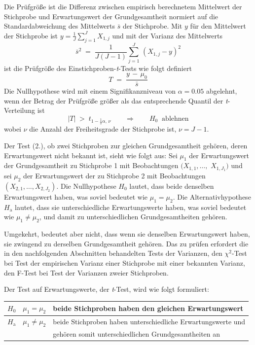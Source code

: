 Die Prüfgröße ist die Differenz zwischen empirisch berechnetem Mittelwert der Stichprobe
und Erwartungswert der Grundgesamtheit normiert auf die
Standardabweichung des Mittelwerts $\bar s$ der Stichprobe. Mit $y$ für den Mittelwert der
Stichprobe ist $y = \frac{1}{J}\sum_{j=1}^J X_{1,j}$ und mit der Varianz des Mittelwerts
\begin{equation}
\bar s^2 \; = \; \frac{1}{J (J - 1)} \sum_{j=1}^{J} \, (X_{1,j} - y)^2
\end{equation}
ist die Prüfgröße des Einstichproben-\textsl{t}-Tests wie folgt definiert
\begin{equation}
T \; = \; \frac{y \, - \, \mu_0}{\bar s}
\label{tTestonesample}
\end{equation}
Die Nullhypothese wird mit einem Signifikanzniveau von $\alpha = 0.05$ abgelehnt, wenn
der Betrag der Prüfgröße größer als das entsprechende Quantil der \textsl{t}-Verteilung ist
\begin{equation}
|T| \; > \; t_{1-\frac{1}{2} \alpha, \, \nu} \qquad \Rightarrow \qquad H_0 \; \; \mathrm{ablehnen}
\end{equation}
wobei $\nu$ die Anzahl der Freiheitsgrade der Stichprobe ist, $\nu = J-1$.

Der Test (2.), ob zwei Stichproben zur gleichen Grundgesamtheit gehören,
 deren Erwartungswert nicht bekannt ist, sieht wie folgt aus:
Sei $\mu_1$ der Erwartungswert der Grundgesamtheit zu Stichprobe 1 mit
Beobachtungen $(X_{1,1},\dots,$ $X_{1,J_1})$ und sei $\mu_2$ der Erwartungswert der
zu Stichprobe 2 mit Beobachtungen $(X_{2,1}, \dots, X_{2,J_2})$.
Die Nullhypothese $H_0$ lautet, dass beide denselben Erwartungswert haben,
was soviel bedeutet wie $\mu_1 = \mu_2$. Die Alternativhypothese $H_\mathrm{a}$
lautet, dass sie unterschiedliche Erwartungswerte haben, was soviel bedeutet wie $\mu_1 \neq \mu_2$,
und damit zu unterschiedlichen Grundgesamtheiten gehören.

Umgekehrt, bedeutet aber nicht, dass wenn sie denselben Erwartungswert haben,
sie zwingend zu derselben Grundgesamtheit gehören. Das zu prüfen erfordert die
in den nachfolgenden Abschnitten behandelten Tests der Varianzen, den $\chi^2$-Test bei
Test der empirischen Varianz einer Stichprobe mit einer bekannten Varianz, den
F-Test bei Test der Varianzen zweier Stichproben.

Der Test auf Erwartungswerte, der \textsl{t}-Test, wird wie folgt formuliert:
\begin{center}
\begin{tabular}{c|cl}
$H_0$ & $\mu_1 = \mu_2$ & beide Stichproben haben den gleichen Erwartungswert\\
\hline
$H_\mathrm{a}$ & $\mu_1 \neq \mu_2$ & beide Stichproben haben unterschiedliche Erwartungswerte und\\
 & & gehören somit unterschiedlichen Grundgesamtheiten an
\end{tabular}
\end{center}

